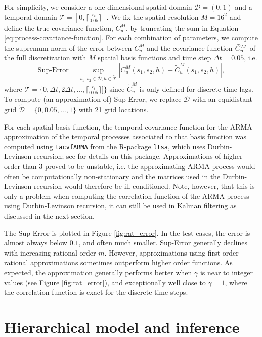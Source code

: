 \documentclass[12pt]{article} %
\begin{document}
For simplicity, we consider a one-dimensional spatial domain $\mathcal{D} = (0,1)$ and a temporal domain $\mathcal{T}=[0,\lceil \frac{r_t}{0.05} \rceil]$. We fix the spatial resolution $M = 16^2$ and define the true covariance function, $C_u^{M}$, by truncating the sum in Equation \eqref{eq:process-covariance-function}. For each combination of parameters, we compute the supremum norm of the error between $C_u^{M}$ and the covariance function $\Tilde{C}_u^{M}$ of the full discretization with $M$ spatial basis functions and time step $\Delta t = 0.05$, i.e.
$$
    \text{Sup-Error}=\sup_{s_1,s_2\in\mathcal{D}, h\in\tilde{\mathcal{T}}} \left|C_u^{M}(s_1,s_2, h)-\tilde{C}_u^{M}(s_1,s_2,h)\right|,
$$
where  $\tilde{\mathcal{T}} = \{0, \Delta t, 2\Delta t, \ldots, \lceil \frac{r_t}{0.05} \rceil]\}$ since $\tilde{C}_{u}^{M}$ is only defined for discrete time lags. To compute (an approximation of) Sup-Error, we replace $\mathcal{D}$ with an equidistant grid $\tilde{\mathcal{D}} = \{0, 0.05, \ldots, 1\}$ with 21 grid locations.

For each spatial basis function, the temporal covariance function for the ARMA-approximation of the temporal processes associated to that basis function was computed using \verb|tacvfARMA| from the \textsf{R}-package \texttt{ltsa}, which uses Durbin-Levinson recursion; see \cite{McLeod2007} for details on this package. Approximations of higher order than $3$ proved to be unstable, i.e. the approximating ARMA-process would often be computationally non-stationary and the matrices used in the Durbin-Levinson recursion would therefore be ill-conditioned. Note, however, that this is only a problem when computing the correlation function of the ARMA-process using Durbin-Levinson recursion, it can still be used in Kalman filtering as discussed in the next section. 

The Sup-Error is plotted in Figure \ref{fig:rat_error}. In the test cases, the error is almost always below $0.1$, and often much smaller. Sup-Error generally declines with increasing rational order $m$. However, approximations using first-order rational approximations sometimes outperform higher order functions. As expected, the approximation %
generally performs better when $\gamma$ is near to integer values (see Figure \ref{fig:rat_error}), and exceptionally well close to $\gamma = 1$, where the correlation function is exact for the discrete time steps. 

\section{Hierarchical model and inference}\label{sec:ModelAndInf}
\end{document}
